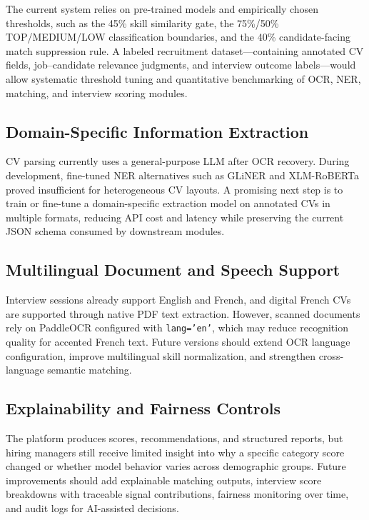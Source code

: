 The current system relies on pre-trained models and empirically chosen thresholds, such as the 45\% skill similarity gate, the 75\%/50\% TOP/MEDIUM/LOW classification boundaries, and the 40\% candidate-facing match suppression rule. A labeled recruitment dataset---containing annotated CV fields, job--candidate relevance judgments, and interview outcome labels---would allow systematic threshold tuning and quantitative benchmarking of OCR, NER, matching, and interview scoring modules.

\subsection{Domain-Specific Information Extraction}

CV parsing currently uses a general-purpose LLM after OCR recovery. During development, fine-tuned NER alternatives such as GLiNER and XLM-RoBERTa proved insufficient for heterogeneous CV layouts. A promising next step is to train or fine-tune a domain-specific extraction model on annotated CVs in multiple formats, reducing API cost and latency while preserving the current JSON schema consumed by downstream modules.

\subsection{Multilingual Document and Speech Support}

Interview sessions already support English and French, and digital French CVs are supported through native PDF text extraction. However, scanned documents rely on PaddleOCR configured with \texttt{lang='en'}, which may reduce recognition quality for accented French text. Future versions should extend OCR language configuration, improve multilingual skill normalization, and strengthen cross-language semantic matching.

\subsection{Explainability and Fairness Controls}

The platform produces scores, recommendations, and structured reports, but hiring managers still receive limited insight into why a specific category score changed or whether model behavior varies across demographic groups. Future improvements should add explainable matching outputs, interview score breakdowns with traceable signal contributions, fairness monitoring over time, and audit logs for AI-assisted decisions.

